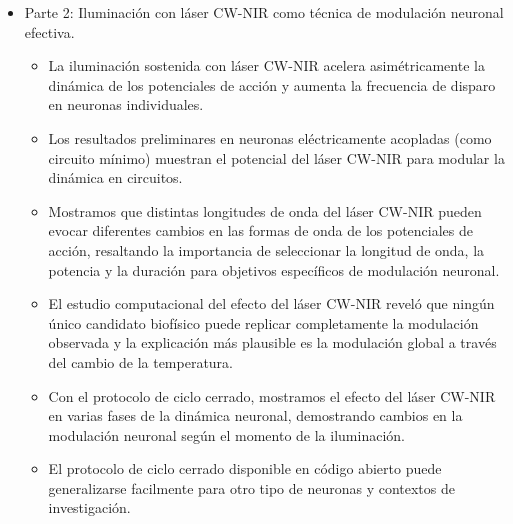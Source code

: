 \begin{itemize}
	\item Parte 2: Iluminación con láser CW-NIR como técnica de modulación neuronal efectiva.
	\begin{itemize}
		\item La iluminación sostenida con láser CW-NIR acelera asimétricamente la dinámica de los potenciales de acción y aumenta la frecuencia de disparo en neuronas individuales.
		\item Los resultados preliminares en neuronas eléctricamente acopladas (como circuito mínimo) muestran el potencial del láser CW-NIR para modular la dinámica en circuitos.
		\item Mostramos que distintas longitudes de onda del láser CW-NIR pueden evocar diferentes cambios en las formas de onda de los potenciales de acción, resaltando la importancia de seleccionar la longitud de onda, la potencia y la duración para objetivos específicos de modulación neuronal.
		\item    El estudio computacional del efecto del láser CW-NIR reveló que ningún único candidato biofísico puede replicar completamente la modulación observada y la explicación más plausible es la modulación global a través del cambio de la temperatura.
		\item Con el protocolo de ciclo cerrado, mostramos el efecto del láser CW-NIR en varias fases de la dinámica neuronal, demostrando cambios en la modulación neuronal según el momento de la iluminación.
		\item El protocolo de ciclo cerrado disponible en código abierto puede generalizarse facilmente para otro tipo de neuronas y contextos de investigación.
	\end{itemize}
	
\end{itemize}

